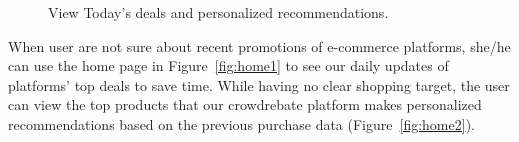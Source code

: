 \begin{figure}[t!]
	\caption{View Today's deals and personalized recommendations.}\vspace{-3ex}
	\label{fig:home}
\end{figure}
When user are not sure about recent promotions of e-commerce platforms, she/he can use the home page in Figure~\ref{fig:home1} to see our daily updates of platforms' top deals to save time. While having no clear shopping target, the user can view the top products that our crowdrebate platform makes personalized recommendations based on the previous purchase data (Figure~\ref{fig:home2}).

